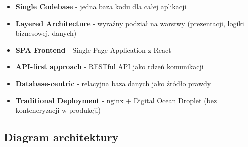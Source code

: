     \begin{itemize}
        \item \textbf{Single Codebase} - jedna baza kodu dla całej aplikacji
        \item \textbf{Layered Architecture} - wyraźny podział na warstwy (prezentacji, logiki biznesowej, danych)
        \item \textbf{SPA Frontend} - Single Page Application z React
        \item \textbf{API-first approach} - RESTful API jako rdzeń komunikacji
        \item \textbf{Database-centric} - relacyjna baza danych jako źródło prawdy
        \item \textbf{Traditional Deployment} - nginx + Digital Ocean Droplet (bez konteneryzacji w produkcji)
    \end{itemize}

    \subsection{Diagram architektury}


